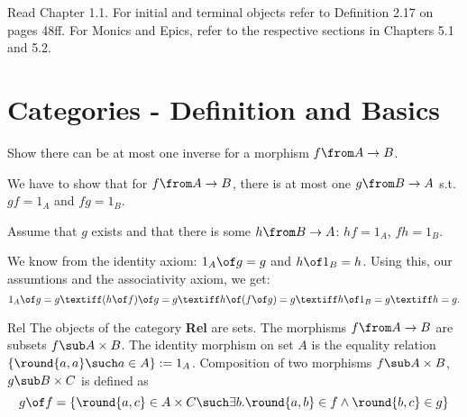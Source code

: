\def\pathToRoot{../../}



\author{Sarah Mameche, Andreas Meyer, Leonhard Staut}

\begin{hint}
  Read Chapter 1.1. For initial and terminal objects refer to Definition 2.17 on pages 48ff. For Monics and Epics, refer to the respective sections in Chapters 5.1 and 5.2.
\end{hint}



%

\section{Categories - Definition and Basics}

\begin {exercise}
Show there can be at most one inverse for a morphism $f \from A \to B$.
\end{exercise}

\begin{answer}
  We have to show that for $f \from A \to B$, there is at most one $g
  \from B \to A$ s.t. $gf = 1_A$ and $fg = 1_B$.

  Assume that $g$ exists and that there is some $h \from B \to A$: $hf = 1_A$, $fh = 1_B$.

  We know from the identity axiom: $1_A \of g = g$ and $h \of 1_B = h$. Using this, our assumtions and the associativity axiom, we get:
 \[  1_A \of g = g \textiff (h \of f) \of g = g \textiff h \of (f \of g) = g \textiff h \of 1_B = g \textiff h=g. \]
\end{answer}

\begin {definition}{Rel}
The objects of the category \textbf{Rel} are sets. The morphisms $f \from A \to B$ are subsets $f \sub A \times B$.
The identity morphism on set $A$ is the equality relation $\{\round{a,a} \such a \in A\} := 1_A$.
Composition of two morphisms $f \sub A \times B$, $g \sub B \times C$ is defined as
\[ g \of f = \{ \round{a, c} \in A \times C \such \exists b. \round{a, b} \in f \land \round{b, c} \in g\} \]

\end{definition}

